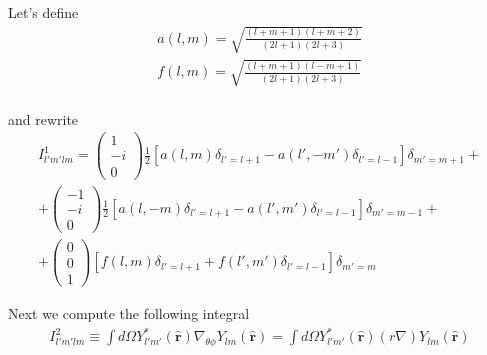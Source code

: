 \documentclass[aps,prb,floatfix,epsfig,singlecolumn,showpacs,preprintnumbers]{revtex4}
\renewcommand{\vr}{{\mathbf{r}}}
\begin{document}
Let's define
\begin{eqnarray}
a(l,m)=\sqrt{\frac{(l+m+1)(l+m+2)}{(2l+1)(2l+3)}}\\
f(l,m)=\sqrt{\frac{(l+m+1)(l-m+1)}{(2l+1)(2l+3)}}\\
\end{eqnarray}

and rewrite
\begin{eqnarray}
I^1_{l'm'lm}=
\left(
\begin{array}{c}
1\\
-i\\
0
\end{array}
\right)
\frac{1}{2}\left[
a(l,m) 
\delta_{l'=l+1}-
a(l',-m') 
\delta_{l'=l-1}
\right]\delta_{m'=m+1}
+\\+
\left(
\begin{array}{c}
-1\\
-i\\
0
\end{array}
\right)
\frac{1}{2}\left[
a(l,-m)
\delta_{l'=l+1}
-
a(l',m')\delta_{l'=l-1}
\right]\delta_{m'=m-1}
+\\+
\left(
\begin{array}{c}
0\\
0\\
1
\end{array}
\right)
\left[
f(l,m)
\delta_{l'=l+1}
+
f(l',m')
\delta_{l'=l-1}
\right]\delta_{m'=m}
\end{eqnarray}


Next we compute the following integral
\begin{eqnarray}
I^2_{l'm'lm}\equiv\int d\Omega Y^*_{l'm'}(\hat{\vr}) \nabla_{\theta\phi} Y_{lm}(\hat{\vr})=
\int d\Omega Y^*_{l'm'}(\hat{\vr}) (r\nabla)   Y_{lm}(\hat{\vr})
\end{eqnarray}
\end{document}
